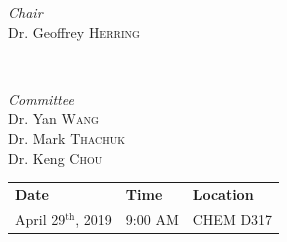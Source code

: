 \begin{titlepage}
	\vspace{1cm}
	
	\begin{minipage}{0.4\textwidth}
		\begin{flushleft}
			\large
			\textit{Chair}\\
			Dr. Geoffrey \textsc{Herring} %
		\end{flushleft}
	\end{minipage}
	~
	\begin{minipage}{0.4\textwidth}
		\begin{flushright}
			\large
			\textit{Committee}\\
			Dr. Yan \textsc{Wang}\\ %
			Dr. Mark \textsc{Thachuk}\\ %
			Dr. Keng \textsc{Chou} %
		\end{flushright}
	\end{minipage}
	
	
	\vfill\vfill\vfill %
	
	{\large
	\begin{table}[H]
		\centering
		\begin{tabular}{lll}
			\textbf{Date} & \textbf{Time} & \textbf{Location} \\
			April 29$^{\text{th}}$, 2019 & 9:00 AM & CHEM D317
		\end{tabular}
	\end{table}
	}
	
	 
	
	\vfill %
	
\end{titlepage}

